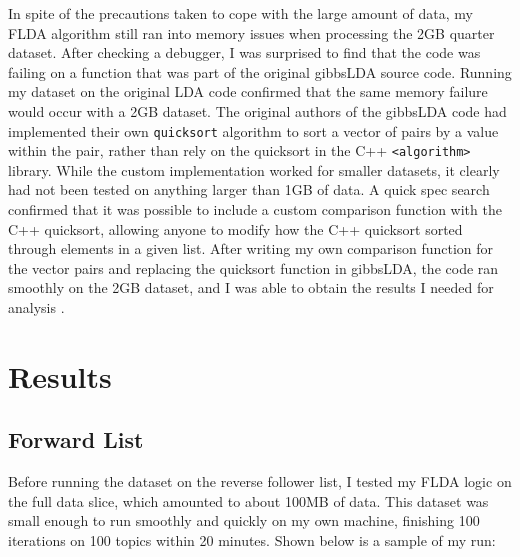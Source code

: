 \documentclass[a4paper]{article}
\begin{document}
In spite of the precautions taken to cope with the large amount of data, my FLDA algorithm still ran into memory issues when processing the 2GB quarter dataset. After checking a debugger, I was surprised to find that the code was failing on a function that was part of the original gibbsLDA source code. Running my dataset on the original LDA code confirmed that the same memory failure would occur with a 2GB dataset. The original authors of the gibbsLDA code had implemented their own \verb+quicksort+ algorithm to sort a vector of pairs by a value within the pair, rather than rely on the quicksort in the C++ \verb+<algorithm>+ library. While the custom implementation worked for smaller datasets, it clearly had not been tested on anything larger than 1GB of data. A quick spec search confirmed that it was possible to include a custom comparison function with the C++ quicksort, allowing anyone to modify how the C++ quicksort sorted through elements in a given list. After writing my own comparison function for the vector pairs and replacing the quicksort function in gibbsLDA, the code ran smoothly on the 2GB dataset, and I was able to obtain the results I needed for analysis \cite{gibbs_lda}.

\section{Results}
\label{sec:results}
\subsection{Forward List}\label{sec:forward_flda}
Before running the dataset on the reverse follower list, I tested my FLDA logic on the full data slice, which amounted to about 100MB of data. This dataset was small enough to run smoothly and quickly on my own machine, finishing 100 iterations on 100 topics within 20 minutes. Shown below is a sample of my run:
\end{document}
